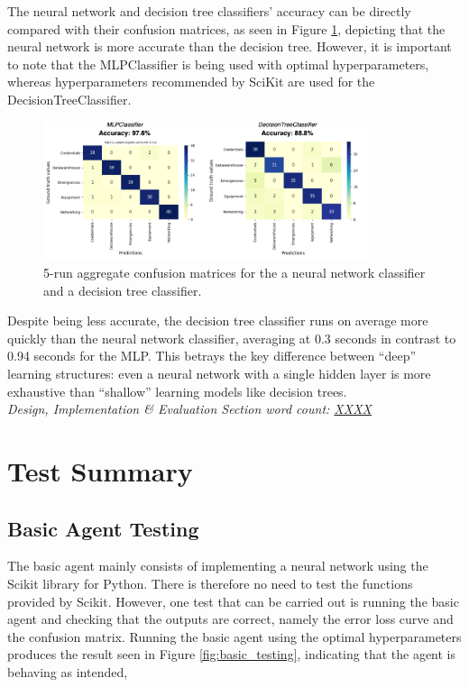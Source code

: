 \documentclass[letterpaper,12pt]{article}
\begin{document}
The neural network and decision tree classifiers' accuracy can be directly compared with their confusion matrices, as seen in Figure \ref{fig:evaluation_mlp_dt}, depicting that the neural network is more accurate than the decision tree. However, it is important to note that the MLPClassifier is being used with optimal hyperparameters, whereas hyperparameters recommended by SciKit are used for the DecisionTreeClassifier.

\begin{figure}[h] 
\centerline{\includegraphics[width=0.85\textwidth]{report/figures/evaluation_mlp_dt.png}}
\caption{\label{fig:evaluation_mlp_dt}5-run aggregate confusion matrices for the a neural network classifier and a decision tree classifier.}
\end{figure}

Despite being less accurate, the decision tree classifier runs on average more quickly than the neural network classifier, averaging at 0.3 seconds in contrast to 0.94 seconds for the MLP. This betrays the key difference between ``deep'' learning structures: even a neural network with a single hidden layer is more exhaustive than ``shallow'' learning models like decision trees.\\

\textit{Design, Implementation \& Evaluation Section word count: \underline{XXXX}}

\clearpage
\section{Test Summary}
\label{sec:test-summary}

\subsection{Basic Agent Testing}

The basic agent mainly consists of implementing a neural network using the Scikit library for Python. There is therefore no need to test the functions provided by Scikit. However, one test that can be carried out is running the basic agent and checking that the outputs are correct, namely the error loss curve and the confusion matrix. Running the basic agent using the optimal hyperparameters produces the result seen in Figure \ref{fig:basic_testing}, indicating that the agent is behaving as intended,
\end{document}
